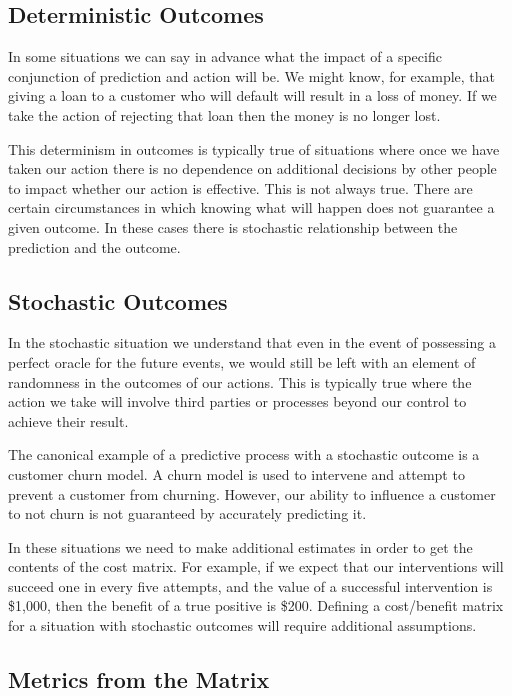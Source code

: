 \documentclass[11pt,a4paper]{article}
\begin{document}
\subsection{Deterministic Outcomes}

In some situations we can say in advance what the impact of a specific conjunction of prediction
and action will be. We might know, for example, that giving a loan to a customer who will default will result
in a loss of money. If we take the action of rejecting that loan then the money is no longer lost.

This determinism in outcomes is typically true of situations where once we have taken our action there is no dependence
on additional decisions by other people to impact whether our action is effective.
This is not always true. There are certain circumstances in which knowing what will happen does
not guarantee a given outcome. In these cases there is stochastic relationship between the prediction and the outcome.


\subsection{Stochastic Outcomes}

In the stochastic situation we understand that even in the event of possessing a perfect oracle for the future events,
we would still be left with an element of randomness in the outcomes of our actions. This is typically true where the action we take
will involve third parties or processes beyond our control to achieve their result.

The canonical example of a predictive process with a stochastic outcome is a customer churn model.
A churn model is used to intervene and attempt to prevent a customer from churning.
However, our ability to influence a customer to not churn is not guaranteed by accurately predicting it.

In these situations we need to make additional estimates in order to get the contents of the cost matrix. For example,
if we expect that our interventions will succeed one in every five attempts, and the value of a successful intervention
is \$1,000, then the benefit of a true positive is \$200.
Defining a cost/benefit matrix for a situation with stochastic outcomes will
require additional assumptions.

\subsection{Metrics from the Matrix}
\end{document}
